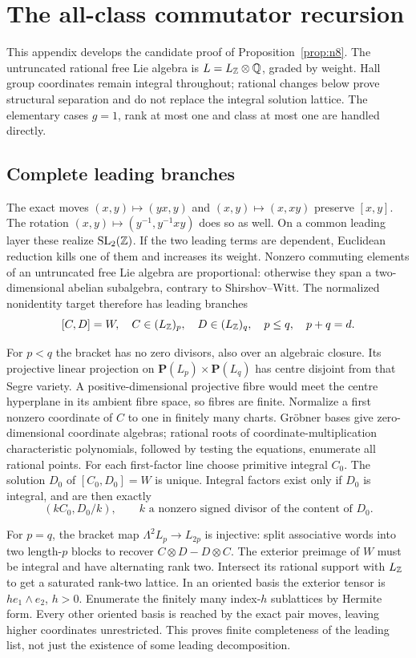 \section{The all-class commutator recursion}\label{app:commutator}

This appendix develops the candidate proof of Proposition~\ref{prop:n8}.
The untruncated rational free Lie algebra is $L=L_\mathbb Z\otimes\mathbb Q$,
graded by weight. Hall group coordinates remain integral throughout;
rational changes below prove structural separation and do not replace
the integral solution lattice. The elementary cases $g=1$, rank at
most one and class at most one are handled directly.

\subsection{Complete leading branches}
The exact moves $(x,y)\mapsto(yx,y)$ and $(x,y)\mapsto(x,xy)$
preserve $[x,y]$. The rotation
$(x,y)\mapsto(y^{-1},y^{-1}xy)$ does so as well. On a common leading
layer these realize $\operatorname{SL}_2(\mathbb Z)$. If the two leading terms are
dependent, Euclidean reduction kills one of them and increases its
weight. Nonzero commuting elements of an untruncated free Lie algebra
are proportional: otherwise they span a two-dimensional abelian
subalgebra, contrary to Shirshov--Witt. The normalized nonidentity
target therefore has leading branches
\[
 [C,D]=W,\quad C\in(L_\mathbb Z)_p,\quad D\in(L_\mathbb Z)_q,
 \quad p\le q,\quad p+q=d.
\]

For $p<q$ the bracket has no zero divisors, also over an algebraic
closure. Its projective linear projection on
$\mathbf P(L_p)\times\mathbf P(L_q)$ has centre disjoint from that
Segre variety. A positive-dimensional projective fibre would meet
the centre hyperplane in its ambient fibre space, so fibres are finite.
Normalize a first nonzero coordinate of $C$ to one in finitely many
charts. Gr\"obner bases give zero-dimensional coordinate algebras;
rational roots of coordinate-multiplication characteristic polynomials,
followed by testing the equations, enumerate all rational points.
For each first-factor line choose primitive integral $C_0$. The
solution $D_0$ of $[C_0,D_0]=W$ is unique. Integral factors exist
only if $D_0$ is integral, and are then exactly
\[
 (kC_0,D_0/k),\qquad k\text{ a nonzero signed divisor of the content of }D_0.
\]

For $p=q$, the bracket map $\Lambda^2L_p\to L_{2p}$ is injective:
split associative words into two length-$p$ blocks to recover
$C\otimes D-D\otimes C$. The exterior preimage of $W$ must be
integral and have alternating rank two. Intersect its rational support
with $L_\mathbb Z$ to get a saturated rank-two lattice. In an oriented
basis the exterior tensor is $h e_1\wedge e_2$, $h>0$. Enumerate
the finitely many index-$h$ sublattices by Hermite form. Every other
oriented basis is reached by the exact pair moves, leaving higher
coordinates unrestricted. This proves finite completeness of the
leading list, not just the existence of some leading decomposition.

